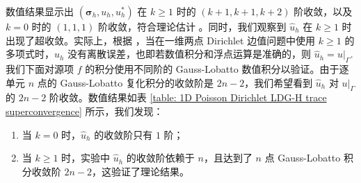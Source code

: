 数值结果显示出 \((\bm\sigma_{h}, u_{h}, u_{h}^{\ast})\) 在 \(k \geqslant 1\) 时的 \((k+1, k+1, k+2)\) 阶收敛，以及 \(k = 0\) 时的 \((1,1,1)\) 阶收敛，符合理论估计 \cite{10.1090/S0025-5718-08-02123-6}。同时，我们观察到 \(\widehat{u}_{h}\) 在 \(k \geqslant 1\) 时出现了超收敛。实际上，根据 \cite[Lemma 2.1]{CASTILLO20034675}，当在一维两点 Dirichlet 边值问题中使用 \(k \geqslant 1\) 的多项式时，\(\widehat{u}_{h}\) 没有离散误差，也即若数值积分和浮点运算是准确的，则 \(\widehat{u}_{h} = u\big|_{\Gamma}\). 我们下面对源项 \(f\) 的积分使用不同阶的 Gauss-Lobatto 数值积分以验证。由于逐单元 \(n\) 点的 Gauss-Lobatto 复化积分的收敛阶是 \(2n-2\)，我们希望看到 \(\widehat{u}_{h}\) 对 \(u\big|_{\Gamma}\) 的 \(2n-2\) 阶收敛。数值结果如表 \ref{table: 1D Poisson Dirichlet LDG-H trace superconvergence} 所示，我们发现：
\begin{enumerate}
	\item 当 \(k = 0\) 时，\(\widehat{u}_{h}\) 的收敛阶只有 \(1\) 阶；
	\item 当 \(k \geqslant 1\) 时，实验中 \(\widehat{u}_{h}\) 的收敛阶依赖于 \(n\)，且达到了 \(n\) 点 Gauss-Lobatto 积分收敛阶 \(2n-2\)，这验证了理论结果。
\end{enumerate}

